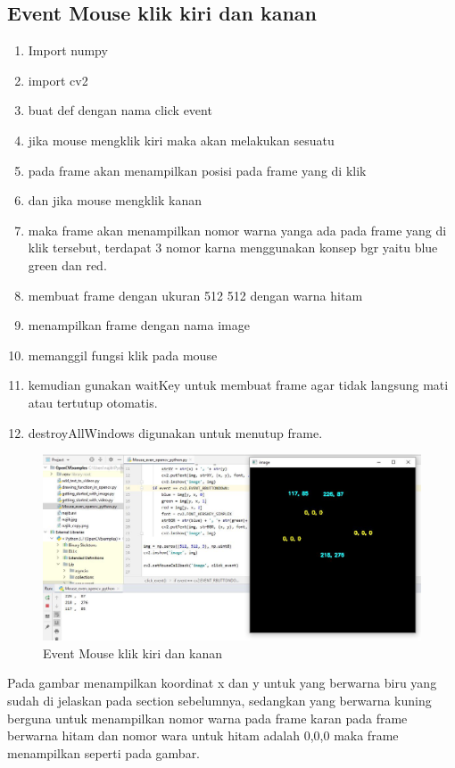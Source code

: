 \subsection{Event Mouse klik kiri dan kanan}

\begin{enumerate}
	\item Import numpy
	\item import cv2
	\item buat def dengan nama click event
	\item jika mouse mengklik kiri maka akan melakukan sesuatu
	\item pada frame akan menampilkan posisi pada frame yang di klik
	\item dan jika mouse mengklik kanan
	\item maka frame akan menampilkan nomor warna yanga ada pada frame yang di klik tersebut, terdapat 3 nomor karna menggunakan konsep bgr yaitu blue green dan red.
	\item membuat frame dengan ukuran 512 512 dengan warna hitam
	\item menampilkan frame dengan nama image
	\item memanggil fungsi klik pada mouse
	\item kemudian gunakan waitKey untuk membuat frame agar tidak langsung mati atau tertutup otomatis.
	\item destroyAllWindows digunakan untuk menutup frame.
\end{enumerate}

\begin{figure}[ht]
\centering
\includegraphics[scale=0.4]{figures/2,21.jpg}
\caption{Event Mouse klik kiri dan kanan}
\label{contoh}
\end{figure}
Pada gambar menampilkan koordinat x dan y untuk yang berwarna biru yang sudah di jelaskan pada section sebelumnya, sedangkan yang berwarna kuning berguna untuk menampilkan nomor warna pada frame karan pada frame berwarna hitam dan nomor wara untuk hitam adalah 0,0,0 maka frame menampilkan seperti pada gambar.



